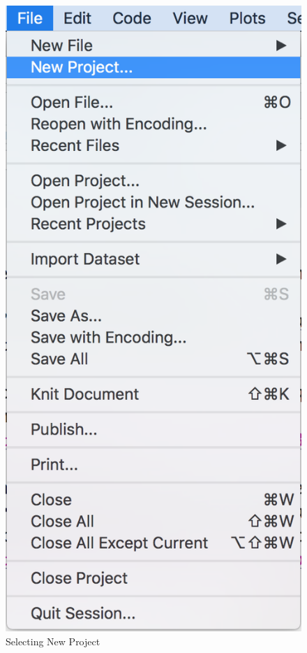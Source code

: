 \documentclass[
]{book}
\begin{document}
\begin{figure}
\includegraphics[width=7.25in]{images/chapter-3/rstudio.file.newproject} \caption{Selecting New Project}\label{fig:filenew-drop}
\end{figure}
\end{document}
